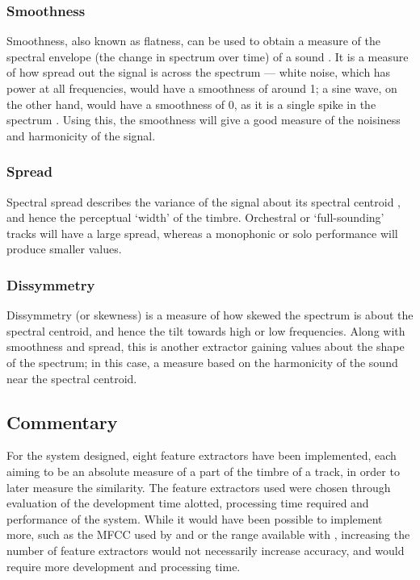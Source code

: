 \subsubsection{Smoothness}

Smoothness, also known as flatness, can be used to obtain a measure of the spectral envelope (the change in spectrum over time) of a sound \citep{Klapuri2003}. It is a measure of how spread out the signal is across the spectrum --- white noise, which has power at all frequencies, would have a smoothness of around 1; a sine wave, on the other hand, would have a smoothness of 0, as it is a single spike in the spectrum \citep{Peeters2004}. Using this, the smoothness will give a good measure of the noisiness and harmonicity of the signal.
\subsubsection{Spread}

Spectral spread describes the variance of the signal about its spectral centroid \citep{Peeters2004}, and hence the perceptual `width' of the timbre. Orchestral or `full-sounding' tracks will have a large spread, whereas a monophonic or solo performance will produce smaller values.
\subsubsection{Dissymmetry}

Dissymmetry (or skewness) is a measure of how skewed the spectrum is about the spectral centroid, and hence the tilt towards high or low frequencies. Along with smoothness and spread, this is another extractor gaining values about the shape of the spectrum; in this case, a measure based on the harmonicity of the sound near the spectral centroid.
\subsection{Commentary}
For the system designed, eight feature extractors have been implemented, each aiming to be an absolute measure of a part of the timbre of a track, in order to later measure the similarity. The feature extractors used were chosen through evaluation of the development time alotted, processing time required and performance of the system. While it would have been possible to implement more, such as the MFCC used by \citet{Schnitzer2003} and \citet{Aucouturier2002a} or the range available with , increasing the number of feature extractors would not necessarily increase accuracy, and would require more development and processing time.
